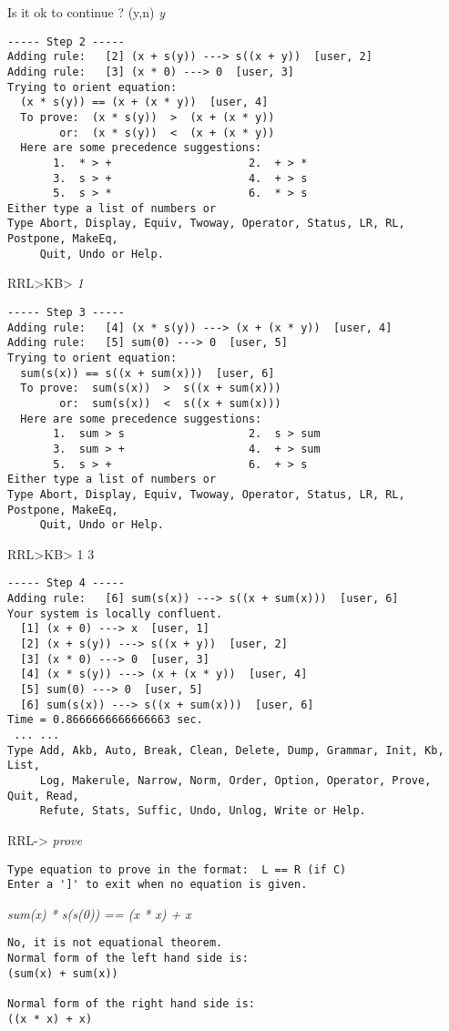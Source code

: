 Is it ok to continue ? (y,n) {\em y}
\begin{verbatim}
----- Step 2 -----
Adding rule:   [2] (x + s(y)) ---> s((x + y))  [user, 2]
Adding rule:   [3] (x * 0) ---> 0  [user, 3]
Trying to orient equation: 
  (x * s(y)) == (x + (x * y))  [user, 4]
  To prove:  (x * s(y))  >  (x + (x * y))
        or:  (x * s(y))  <  (x + (x * y))
  Here are some precedence suggestions:
       1.  * > +                     2.  + > *
       3.  s > +                     4.  + > s
       5.  s > *                     6.  * > s
Either type a list of numbers or
Type Abort, Display, Equiv, Twoway, Operator, Status, LR, RL, Postpone, MakeEq,
     Quit, Undo or Help.
\end{verbatim}
RRL>KB> {\em 1}
\begin{verbatim}
----- Step 3 -----
Adding rule:   [4] (x * s(y)) ---> (x + (x * y))  [user, 4]
Adding rule:   [5] sum(0) ---> 0  [user, 5]
Trying to orient equation: 
  sum(s(x)) == s((x + sum(x)))  [user, 6]
  To prove:  sum(s(x))  >  s((x + sum(x)))
        or:  sum(s(x))  <  s((x + sum(x)))
  Here are some precedence suggestions:
       1.  sum > s                   2.  s > sum
       3.  sum > +                   4.  + > sum
       5.  s > +                     6.  + > s
Either type a list of numbers or
Type Abort, Display, Equiv, Twoway, Operator, Status, LR, RL, Postpone, MakeEq,
     Quit, Undo or Help.
\end{verbatim}
RRL>KB> 1 3
\begin{verbatim}
----- Step 4 -----
Adding rule:   [6] sum(s(x)) ---> s((x + sum(x)))  [user, 6]
Your system is locally confluent.
  [1] (x + 0) ---> x  [user, 1]
  [2] (x + s(y)) ---> s((x + y))  [user, 2]
  [3] (x * 0) ---> 0  [user, 3]
  [4] (x * s(y)) ---> (x + (x * y))  [user, 4]
  [5] sum(0) ---> 0  [user, 5]
  [6] sum(s(x)) ---> s((x + sum(x)))  [user, 6]
Time = 0.8666666666666663 sec.
 ... ...
Type Add, Akb, Auto, Break, Clean, Delete, Dump, Grammar, Init, Kb, List,
     Log, Makerule, Narrow, Norm, Order, Option, Operator, Prove, Quit, Read,
     Refute, Stats, Suffic, Undo, Unlog, Write or Help.
\end{verbatim}
RRL-> {\em prove}
\begin{verbatim}
Type equation to prove in the format:  L == R (if C) 
Enter a ']' to exit when no equation is given.
\end{verbatim}
{\em sum(x) * s(s(0)) == (x * x) + x}
\begin{verbatim}
No, it is not equational theorem.
Normal form of the left hand side is:
(sum(x) + sum(x))

Normal form of the right hand side is:
((x * x) + x)
\end{verbatim}
